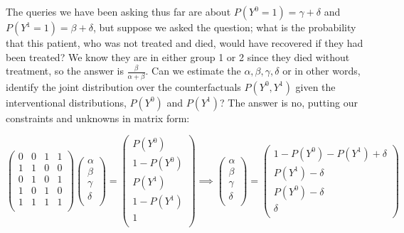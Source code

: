 The queries we have been asking thus far are about $P(Y^{0}=1) = \gamma + \delta$ and $P(Y^{1}=1) = \beta + \delta$, but suppose we asked the question; what is the probability that this patient, who was not treated and died, would have recovered if they had been treated? We know they are in either group 1 or 2 since they died without treatment, so the answer is $\frac{\beta}{\alpha+\beta}$. Can we estimate the $\alpha, \beta, \gamma, \delta$ or in other words, identify the joint distribution over the counterfactuals $P(Y^{0},Y^{1})$ given the interventional distributions, $P(Y^{0})$ and $P(Y^{1})$? The answer is no, putting our constraints and unknowns in matrix form:

\begin{equation}
\left(
\begin{array}{cccc}
0&0&1&1\\
1&1&0&0\\
0&1&0&1\\
1&0&1&0\\
1&1&1&1\\
\end{array}
\right)
\left(
\begin{array}{c}
\alpha\\
\beta\\
\gamma\\
\delta\\
\end{array}
\right)= 
\left(
\begin{array}{c}
P(Y^{0})\\
1-P(Y^{0})\\
P(Y^{1})\\
1-P(Y^{1})\\
1\\
\end{array}
\right)
\implies
\left(
\begin{array}{c}
\alpha\\
\beta\\
\gamma\\
\delta\\
\end{array}
\right)=
\left(
\begin{array}{c}
1-P(Y^{0})-P(Y^{1})+\delta\\
P(Y^{1})-\delta\\
P(Y^{0})-\delta\\
\delta\\
\end{array}
\right)
\end{equation}
